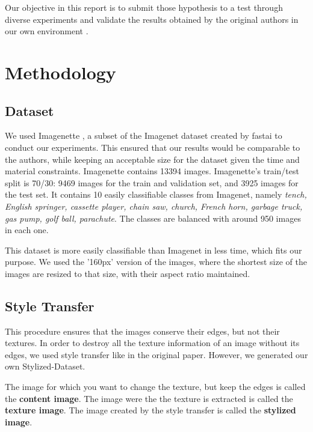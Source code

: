 \documentclass{article}
\begin{document}
\bigskip

Our objective in this report is to submit those hypothesis to a test through diverse experiments 
and validate the results obtained by the original authors in our own environment .

\newpage
\section{Methodology}

\subsection{Dataset}

We used Imagenette \cite{fastai2019}, a subset of the Imagenet dataset created 
by fastai to conduct our experiments.
This ensured that our results would be comparable to the authors, 
while keeping an acceptable size for the dataset given the time and material constraints.
Imagenette contains 13394 images.
Imagenette's train/test split is 70/30: 9469 images for the train and validation set, and 3925 images for the test set.
It contains 10 easily classifiable classes from Imagenet, namely
\textit{tench, English springer, cassette player, chain saw, church, 
French horn, garbage truck, gas pump, golf ball, parachute}.
The classes are balanced with around 950 images in each one. \smallskip \par
\vspace{-0.3cm}
\noindent
This dataset is more easily classifiable than Imagenet in less time, which fits our purpose.
We used the '160px' version of the images, where the shortest size of the images are resized to that size, 
with their aspect ratio maintained.

\subsection{Style Transfer}
\label{2.2-style-transfer}

This procedure ensures that the images conserve their edges, but not their textures.
In order to destroy all the texture information of an image without its edges, we used style transfer like in
the original paper.
However, we generated our own Stylized-Dataset. \medskip \par

\noindent
The image for which you want to change the texture, but keep the edges is called the \textbf{content image}.
The image were the the texture is extracted is called the \textbf{texture image}.
The image created by the style transfer is called the \textbf{stylized image}. \medskip \par
\end{document}

